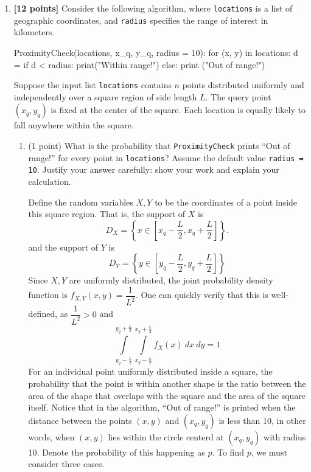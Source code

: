 \documentclass{assignment-263}
\begin{document}
\think
\begin{enumerate}
\item \textbf{[12 points]}
Consider the following algorithm, where \texttt{locations} is a list of geographic coordinates, and \texttt{radius} specifies the range of interest in kilometers.

\begin{python}
ProximityCheck(locations, x_q, y_q, radius = 10):
  for (x, y) in locations:
    d =  
    if d < radius:
      print("Within range!")
    else:
      print ("Out of range!")
\end{python}

Suppose the input list \texttt{locations} contains $n$ points distributed uniformly and independently over a square region of side length $L$. The query point $(x_q, y_q)$ is fixed at the center of the square. Each location is equally likely to fall anywhere within the square.

\begin{enumerate}
    \item (1 point) What is the probability that \texttt{ProximityCheck} prints ``Out of range!'' for every point in \texttt{locations}? Assume the default value \texttt{radius = 10}. Justify your answer carefully: show your work and explain your calculation.
    
    Define the random variables \(X,Y\) to be the coordinates of a point inside this square region. That is, the support of \(X\) is
    \[
      D_X = \left\{x \in \left[x_q - \frac{L}{2}, x_q + \frac{L}{2}\right]\right\}.
    \]
    and the support of \(Y\) is
    \[
      D_Y = \left\{ y \in \left[y_q - \frac{L}{2}, y_q + \frac{L}{2}\right] \right\} 
    \]
    Since \(X,Y\) are uniformly distributed, the joint probability density function is \(f_{X,Y}(x, y) = \dfrac{1}{L^2}\). One can quickly verify that this is well-defined, as \(\dfrac{1}{L^2} > 0\) and
    \[
      \int\limits_{y_q - \frac{L}{2}}^{y_q + \frac{L}{2}} \int\limits_{x_q - \frac{L}{2}}^{x_q + \frac{L}{2}} f_X(x)\ dx\ dy = 1
    \]
    For an individual point uniformly distributed inside a square, the probability that the point is within another shape is the ratio between the area of the shape that overlaps with the square and the area of the square itself. Notice that in the algorithm, ``Out of range!'' is printed when the distance between the points \((x,y)\) and \((x_q, y_q)\) is less than 10, in other words, when \((x,y)\) lies within the circle centerd at \((x_q,y_q)\) with radius 10. Denote the probability of this happening as \(p\). To find \(p\), we must consider three cases.
    

\end{enumerate}
\end{enumerate}
\end{document}
